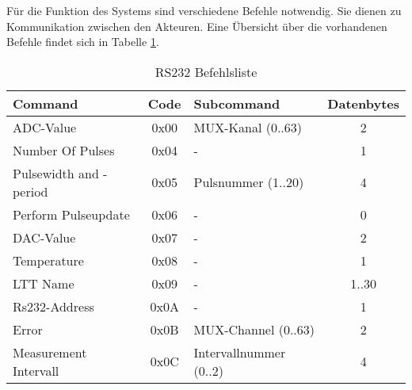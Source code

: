 Für die Funktion des Systems sind verschiedene Befehle notwendig. Sie dienen zu Kommunikation zwischen den Akteuren.
Eine Übersicht über die vorhandenen Befehle findet sich in Tabelle \ref{table_RS232Commands}.

\begin{table}[H]
\begin{center}
\begin{tabularx}{\textwidth}{|X|c|X|c|}\hline 
 Command & Code & Subcommand & Datenbytes \\ \hline
 ADC-Value & 0x00 & MUX-Kanal (0..63) & 2  \\ \hline
 Number Of Pulses & 0x04 & - & 1  \\ \hline
 Pulsewidth and -period & 0x05 & Pulsnummer (1..20) & 4  \\ \hline
 Perform Pulseupdate & 0x06 & - & 0   \\ \hline
 DAC-Value & 0x07 & - & 2 \\ \hline
 Temperature & 0x08 & - & 1  \\ \hline
 LTT Name & 0x09 & - & 1..30  \\ \hline
 Rs232-Address & 0x0A & - & 1 \\ \hline
 Error & 0x0B & MUX-Channel (0..63) & 2  \\ \hline
 Measurement Intervall & 0x0C & Intervallnummer (0..2) & 4 \\ \hline
\end{tabularx}
\caption{RS232 Befehlsliste}
\label{table_RS232Commands}
\end{center}
\end{table}

